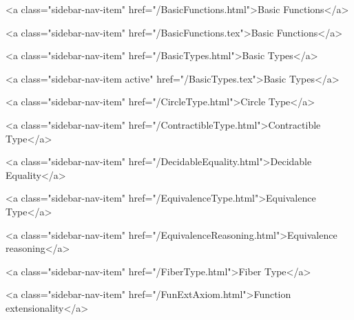          <a class="sidebar-nav-item" href="/BasicFunctions.html">Basic Functions</a>
        
      
    
      
        
          <a class="sidebar-nav-item" href="/BasicFunctions.tex">Basic Functions</a>
        
      
    
      
        
          <a class="sidebar-nav-item" href="/BasicTypes.html">Basic Types</a>
        
      
    
      
        
          <a class="sidebar-nav-item active" href="/BasicTypes.tex">Basic Types</a>
        
      
    
      
        
          <a class="sidebar-nav-item" href="/CircleType.html">Circle Type</a>
        
      
    
      
        
          <a class="sidebar-nav-item" href="/ContractibleType.html">Contractible Type</a>
        
      
    
      
        
          <a class="sidebar-nav-item" href="/DecidableEquality.html">Decidable Equality</a>
        
      
    
      
        
          <a class="sidebar-nav-item" href="/EquivalenceType.html">Equivalence Type</a>
        
      
    
      
        
          <a class="sidebar-nav-item" href="/EquivalenceReasoning.html">Equivalence reasoning</a>
        
      
    
      
        
          <a class="sidebar-nav-item" href="/FiberType.html">Fiber Type</a>
        
      
    
      
        
          <a class="sidebar-nav-item" href="/FunExtAxiom.html">Function extensionality</a>
        
      
    
